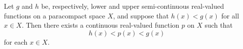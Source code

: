 Let $g$ and $h$ be, respectively, lower and upper semi-continuous real-valued functions on a paracompact space $X$, and suppose that $h(x) < g(x)$ for all $x \in X$. Then there exists a continuous real-valued function $p$ on $X$ such that
$$h(x) < p(x) < g(x)$$
for each $x \in X$.
